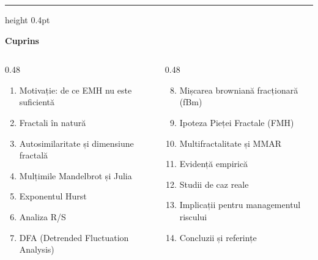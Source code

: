 \documentclass[9pt, aspectratio=169, t]{beamer}
\theoremstyle{definition}
\begin{document}
{
\begin{frame}{}
    {\color{FooterGray}\hrule height 0.4pt}
    \vspace{0.1cm}
    {\Large\textcolor{IDAred}{\textbf{Cuprins}}}
    \vspace{0.2cm}
    {\small
    \begin{columns}[T]
        \begin{column}{0.48\textwidth}
            \begin{enumerate}
                \item Motivație: de ce EMH nu este suficientă
                \item Fractali în natură
                \item Autosimilaritate și dimensiune fractală
                \item Mulțimile Mandelbrot și Julia
                \item Exponentul Hurst
                \item Analiza R/S
                \item DFA (Detrended Fluctuation Analysis)
            \end{enumerate}
        \end{column}
        \begin{column}{0.48\textwidth}
            \begin{enumerate}\setcounter{enumi}{7}
                \item Mișcarea browniană fracționară (fBm)
                \item Ipoteza Pieței Fractale (FMH)
                \item Multifractalitate și MMAR
                \item Evidență empirică
                \item Studii de caz reale
                \item Implicații pentru managementul riscului
                \item Concluzii și referințe
            \end{enumerate}
        \end{column}
    \end{columns}
    }
\end{frame}
}
\end{document}
